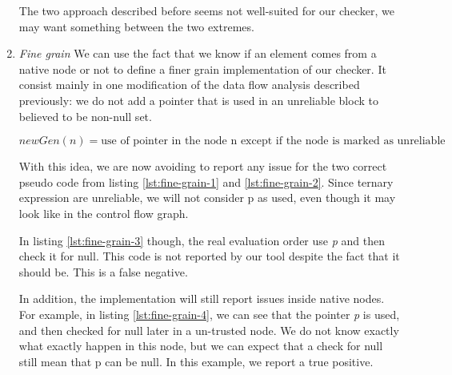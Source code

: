 \begin{enumerate}
The two approach described before seems not well-suited for our checker, we may want something between the two extremes.

\item \textit{Fine grain} \newline
We can use the fact that we know if an element comes from a native node or not to define a finer grain implementation of our checker. 
It consist mainly in one modification of the data flow analysis described previously: we do not add a pointer that is used in an unreliable block to believed to be non-null set.

\begin{equation}\label{eqn:new_dataflow4}
newGen(n) = \text{use of pointer in the node n except if the node is marked as unreliable}
\end{equation}





With this idea, we are now avoiding to report any issue for the two correct pseudo code from listing \ref{lst:fine-grain-1} and \ref{lst:fine-grain-2}. Since ternary expression are unreliable, we will not consider p as used, even though it may look like in the control flow graph.



In listing \ref{lst:fine-grain-3} though, the real evaluation order use \emph{p} and then check it for null. This code is not reported by our tool despite the fact that it should be. This is a false negative.\newline



In addition, the implementation will  still report issues inside native nodes.
For example, in listing \ref{lst:fine-grain-4}, we can see that the pointer \emph{p} is used, and then checked for null later in a un-trusted node. We do not know exactly what exactly happen in this node, but we can expect that a check for null still mean that p can be null. 
In this example, we report a true positive.
\end{enumerate}

